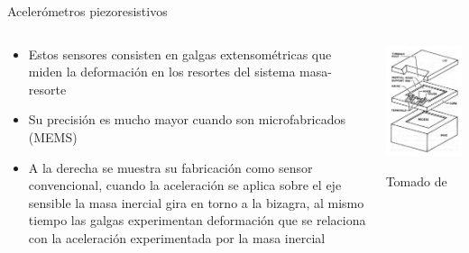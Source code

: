 \documentclass[aspectratio=169]{beamer}
\begin{document}
\begin{frame}{Acelerómetros piezoresistivos}
    \begin{columns}[c, onlytextwidth]
        \begin{column}{0.65\textwidth}
            \begin{itemize}
                \item Estos sensores consisten en galgas extensométricas que miden la deformación en los resortes del sistema masa-resorte
                \item Su precisión es mucho mayor cuando son microfabricados (MEMS)
                \item A la derecha se muestra su fabricación como sensor convencional, cuando la aceleración se aplica sobre el eje sensible la masa inercial gira en torno a la bizagra, al mismo tiempo las galgas experimentan deformación que se relaciona con la aceleración experimentada por la masa inercial
            \end{itemize}
        \end{column}
        \begin{column}{0.35\textwidth}
            \centering
            \includegraphics[width = 0.8\linewidth]{fig/Fuerza_Vibracion/memspiezoacc.JPG}
            
            \tiny{Tomado de \cite{Fraden_2016}}
        \end{column}
    \end{columns}
\end{frame}
\end{document}
